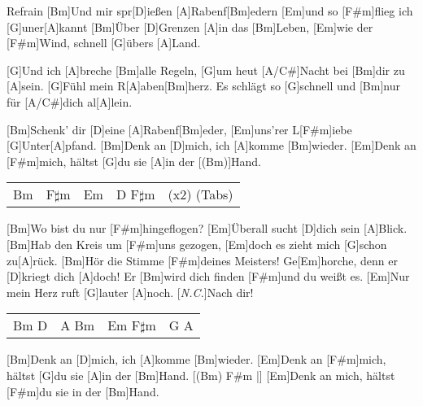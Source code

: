 \begin{guitar}
  \begin{chorus}{Refrain}
	[Bm]Und mir spr[D]ießen [A]Rabenf[Bm]edern [Em]und so [F#m]flieg ich [G]uner[A]kannt
	[Bm]{Ü}ber [D]Grenzen [A]in das [Bm]Leben, [Em]wie der [F#m]Wind, schnell [G]{ü}bers [A]Land.
	
	[G]Und ich [A]breche [Bm]alle Regeln, [G]um heut [A/C#]Nacht bei [Bm]dir zu [A]sein.
	[G]Fühl mein R[A]aben[Bm]herz. Es schlägt so [G]schnell und [Bm]nur für [A/C#]dich al[A]lein.
	
	[Bm]Schenk' dir [D]eine [A]Rabenf[Bm]eder, [Em]uns'rer L[F#m]iebe [G]Unter[A]pfand.
	[Bm]Denk an [D]mich, ich [A]komme [Bm]wieder. [Em]Denk an [F#m]mich, hältst [G]du sie [A]in der [(Bm)]Hand.%
  \end{chorus}
	
	 {\footnotesize\begin{tabular}{l|l|l|ll}
			Bm & F$\sharp$m & Em & D F$\sharp$m & (x2) (Tabs)
	\end{tabular}}
	
	[Bm]Wo bist du nur [F#m]hingeflogen? [Em]{Ü}berall sucht [D]dich sein [A]Blick.
	[Bm]Hab den Kreis um [F#m]uns gezogen, [Em]doch es zieht mich [G]schon zu[A]rück.
	[Bm]Hör die Stimme [F#m]deines Meisters! Ge[Em]horche, denn er [D]kriegt dich [A]doch!
	Er [Bm]wird dich finden [F#m]und du weißt es. [Em]Nur mein Herz ruft [G]lauter [A]noch.
	[\textit{N.C.}]Nach dir!
	
	 
	
	{\footnotesize\begin{tabular}{l|l|l|l}
			Bm D & A Bm  & Em F$\sharp$m & G A
	\end{tabular}}

	[Bm]Denk an [D]mich, ich [A]komme [Bm]wieder. [Em]Denk an [F#m]mich, hältst [G]du sie [A]in der [Bm]Hand.
	[(Bm) F#m |] [Em]Denk an mich, hältst [F#m]du sie in der [Bm]Hand.
\end{guitar}
